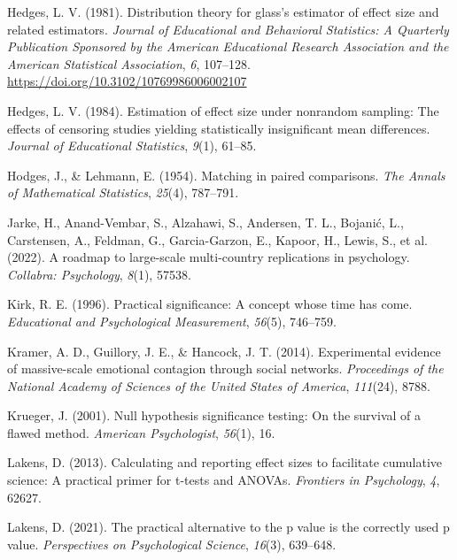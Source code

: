 \documentclass[
  man,floatsintext]{apa7}
\newlength{\cslhangindent}
\newenvironment{CSLReferences}[2] %
 {\begin{list}{}{%
  \setlength{\itemindent}{0pt}
  \setlength{\leftmargin}{0pt}
  \setlength{\parsep}{0pt}
  \ifodd #1
   \setlength{\leftmargin}{\cslhangindent}
   \setlength{\itemindent}{-1\cslhangindent}
  \fi
  \setlength{\itemsep}{#2\baselineskip}}}
 {\end{list}}
\begin{document}
\begin{CSLReferences}{1}{0}
Hedges, L. V. (1981). Distribution theory for glass's estimator of effect size and related estimators. \emph{Journal of Educational and Behavioral Statistics: A Quarterly Publication Sponsored by the American Educational Research Association and the American Statistical Association}, \emph{6}, 107--128. \url{https://doi.org/10.3102/10769986006002107}

Hedges, L. V. (1984). Estimation of effect size under nonrandom sampling: The effects of censoring studies yielding statistically insignificant mean differences. \emph{Journal of Educational Statistics}, \emph{9}(1), 61--85.

Hodges, J., \& Lehmann, E. (1954). Matching in paired comparisons. \emph{The Annals of Mathematical Statistics}, \emph{25}(4), 787--791.

Jarke, H., Anand-Vembar, S., Alzahawi, S., Andersen, T. L., Bojanić, L., Carstensen, A., Feldman, G., Garcia-Garzon, E., Kapoor, H., Lewis, S., et al. (2022). A roadmap to large-scale multi-country replications in psychology. \emph{Collabra: Psychology}, \emph{8}(1), 57538.

Kirk, R. E. (1996). Practical significance: A concept whose time has come. \emph{Educational and Psychological Measurement}, \emph{56}(5), 746--759.

Kramer, A. D., Guillory, J. E., \& Hancock, J. T. (2014). Experimental evidence of massive-scale emotional contagion through social networks. \emph{Proceedings of the National Academy of Sciences of the United States of America}, \emph{111}(24), 8788.

Krueger, J. (2001). Null hypothesis significance testing: On the survival of a flawed method. \emph{American Psychologist}, \emph{56}(1), 16.

Lakens, D. (2013). Calculating and reporting effect sizes to facilitate cumulative science: A practical primer for t-tests and ANOVAs. \emph{Frontiers in Psychology}, \emph{4}, 62627.

Lakens, D. (2021). The practical alternative to the p value is the correctly used p value. \emph{Perspectives on Psychological Science}, \emph{16}(3), 639--648.


\end{CSLReferences}
\end{document}
